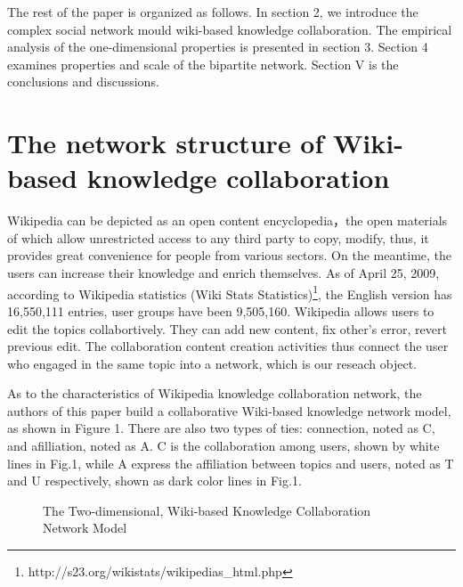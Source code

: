 \documentclass{elsarticle}
\begin{document}
The rest of the paper is organized as follows. In section 2, we
introduce the complex social network mould wiki-based knowledge
collaboration. The empirical analysis of the one-dimensional
properties is presented in section 3. Section 4 examines properties
and scale of the  bipartite network. Section V is
the conclusions and discussions.

\section{The network structure of Wiki-based knowledge collaboration}
\label{sec:netw-struct-wiki}

 Wikipedia
can be depicted as an open content encyclopedia，the open materials of
which allow unrestricted access to any third party to copy, modify,
thus, it  provides great convenience for people from various
sectors. On the meantime, the users can increase their knowledge and
enrich themselves. As of April 25, 2009, according to Wikipedia
statistics (Wiki Stats Statistics)\footnote{http://s23.org/wikistats/wikipedias\_html.php}, the English version has
16,550,111 entries, user groups have been 9,505,160. Wikipedia allows users to edit the topics collabortively. They can add
new content, fix other's error, revert previous edit. The
collaboration content creation activities thus connect the user who
engaged in the same topic into a network, which is our reseach object. 


As to the characteristics of Wikipedia knowledge collaboration
network, the authors of this paper build a collaborative Wiki-based
knowledge network model, as shown in Figure 1. There are also two
types of ties: connection, noted as C, and afilliation, noted as A. C
is the collaboration among users, shown by white lines in Fig.1, while
A express the affiliation between topics and users, noted as T and U respectively, shown as dark color lines in Fig.1. 

\begin{figure}[h]
  \centering
  \scalebox{0.8}{\texttt{[image: 01]}}
  \caption{The Two-dimensional, Wiki-based Knowledge Collaboration Network Model}
\end{figure}
\end{document}
